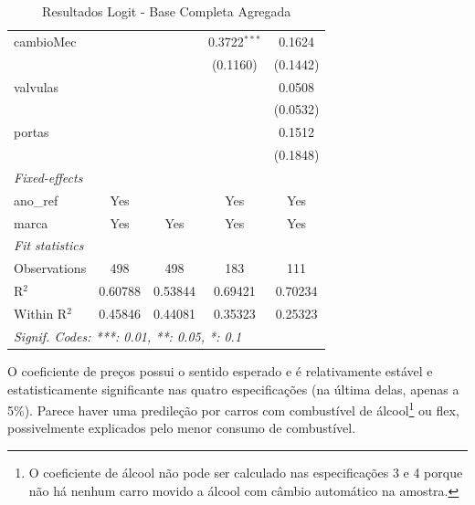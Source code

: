 \documentclass{article}
\begin{document}
\begin{table}[H]
\begin{tabular}{lcccc}
   cambioMec     &                               &                               & 0.3722$^{***}$                 & 0.1624\\   
                 &                               &                               & (0.1160)                       & (0.1442)\\   
   valvulas      &                               &                               &                                & 0.0508\\   
                 &                               &                               &                                & (0.0532)\\   
   portas        &                               &                               &                                & 0.1512\\   
                 &                               &                               &                                & (0.1848)\\   
   \midrule
   \emph{Fixed-effects}\\
   ano\_ref      & Yes                           &                               & Yes                            & Yes\\  
   marca         & Yes                           & Yes                           & Yes                            & Yes\\  
   \midrule
   \emph{Fit statistics}\\
   Observations  & 498                           & 498                           & 183                            & 111\\  
   R$^2$         & 0.60788                       & 0.53844                       & 0.69421                        & 0.70234\\  
   Within R$^2$  & 0.45846                       & 0.44081                       & 0.35323                        & 0.25323\\  
   \midrule \midrule
   \multicolumn{5}{l}{\emph{Signif. Codes: ***: 0.01, **: 0.05, *: 0.1}}\\
\end{tabular}
\par\endgroup
\caption{Resultados Logit - Base Completa Agregada}\label{tablogit}
\end{table}

O coeficiente de preços possui o sentido esperado e é relativamente estável e estatisticamente significante nas quatro especificações (na última delas, apenas a 5\%). Parece haver uma predileção por carros com combustível de álcool\footnote{O coeficiente de álcool não pode ser calculado nas especificações 3 e 4 porque não há nenhum carro movido a álcool com câmbio automático na amostra.} ou flex, possivelmente explicados pelo menor consumo de combustível.
\end{document}
